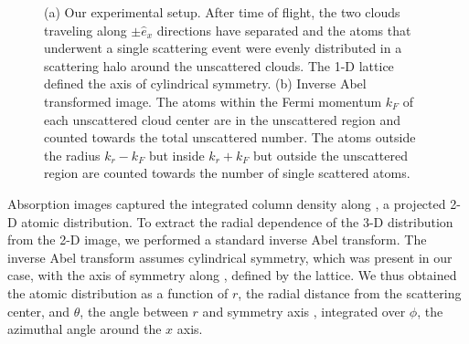 \documentclass[12pt]{iopart}
\begin{document}
\begin{figure}
\caption{(a) Our experimental setup. After time of flight, the two clouds traveling along $\pm \hat{e}_x$ directions have separated and the atoms that underwent a single scattering event were evenly distributed in a scattering halo around the unscattered clouds. The 1-D lattice defined the axis of cylindrical symmetry. (b) Inverse Abel transformed image. The atoms within the Fermi momentum $k_F$ of each unscattered cloud center are in the unscattered region and counted towards the total unscattered number. The atoms outside the radius $k_r-k_F$ but inside $k_r+k_F$ but outside the unscattered region are counted towards the number of single scattered atoms.   }  
\label{fig:halo}
\end{figure}
\par Absorption images captured the integrated column density along \ez{}, a projected 2-D atomic distribution. To extract the radial dependence of the 3-D distribution from the 2-D image, we performed a standard inverse Abel transform. The inverse Abel transform assumes cylindrical symmetry, which was present in our case, with the axis of symmetry along \ex{}, defined by the lattice. We thus obtained the atomic distribution as a function of $r$, the radial distance from the scattering center, and $\theta$, the angle between $r$ and symmetry axis \ex{}, integrated over $\phi$, the azimuthal angle around the $x$ axis. 
\end{document}
